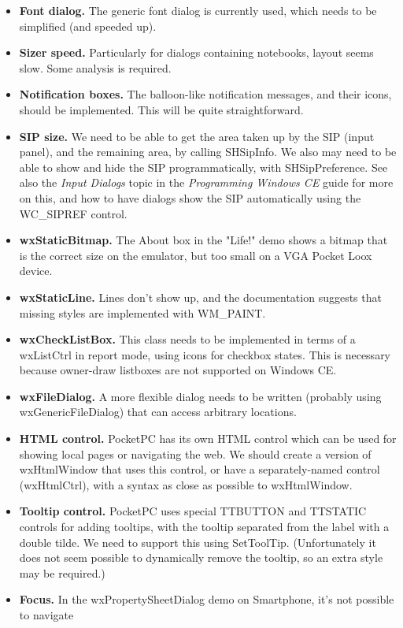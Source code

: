\itemsep=0pt
\begin{itemize}
\item {\bf Font dialog.} The generic font dialog is currently used, which
needs to be simplified (and speeded up).
\item {\bf Sizer speed.} Particularly for dialogs containing notebooks,
layout seems slow. Some analysis is required.
\item {\bf Notification boxes.} The balloon-like notification messages, and their
icons, should be implemented. This will be quite straightforward.
\item {\bf SIP size.} We need to be able to get the area taken up by the SIP (input panel),
and the remaining area, by calling SHSipInfo. We also may need to be able to show and hide
the SIP programmatically, with SHSipPreference. See also the {\it Input Dialogs} topic in
the {\it Programming Windows CE} guide for more on this, and how to have dialogs
show the SIP automatically using the WC\_SIPREF control.
\item {\bf wxStaticBitmap.} The About box in the "Life!" demo shows a bitmap that is
the correct size on the emulator, but too small on a VGA Pocket Loox device.
\item {\bf wxStaticLine.} Lines don't show up, and the documentation suggests that
missing styles are implemented with WM\_PAINT.
\item {\bf wxCheckListBox.} This class needs to be implemented in terms of a wxListCtrl
in report mode, using icons for checkbox states. This is necessary because owner-draw listboxes
are not supported on Windows CE.
\item {\bf wxFileDialog.} A more flexible dialog needs to be written (probably using wxGenericFileDialog)
that can access arbitrary locations.
\item {\bf HTML control.} PocketPC has its own HTML control which can be used for showing
local pages or navigating the web. We should create a version of wxHtmlWindow that uses this
control, or have a separately-named control (wxHtmlCtrl), with a syntax as close as possible to wxHtmlWindow.
\item {\bf Tooltip control.} PocketPC uses special TTBUTTON and TTSTATIC controls for adding
tooltips, with the tooltip separated from the label with a double tilde. We need to support this using SetToolTip.
(Unfortunately it does not seem possible to dynamically remove the tooltip, so an extra style may
be required.)
\item {\bf Focus.} In the wxPropertySheetDialog demo on Smartphone, it's not possible to navigate

\end{itemize}
